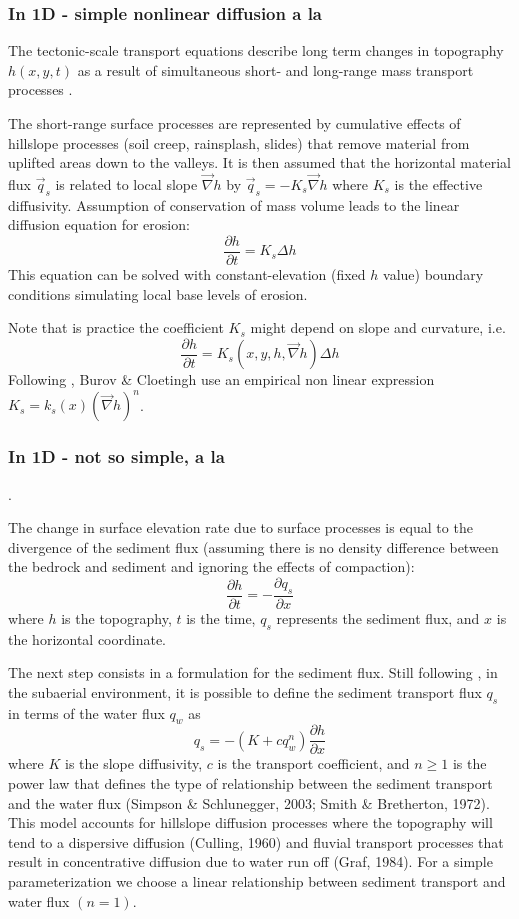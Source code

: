 \subsubsection{In 1D - simple nonlinear diffusion a la \cite{bucl97}}

The tectonic-scale transport equations describe long term changes
in topography $h(x,y,t)$ as a result of simultaneous short- and long-range
mass transport processes \cite{befh92,kobe94}.

The short-range surface processes are represented by cumulative effects of hillslope 
processes (soil creep, rainsplash, slides) that remove material from uplifted areas 
down to the valleys. 
It is then assumed that the horizontal material flux $\vec{q}_s$ is related to 
local slope $\vec\nabla h$ by $\vec{q}_s=-K_s \vec{\nabla}h$ 
where $K_s$ is the effective diffusivity. Assumption of conservation of mass 
volume leads to the linear diffusion equation for erosion:
\[
\frac{\partial h}{\partial t} = K_s \Delta h
\]
This equation can be solved with constant-elevation (fixed $h$ value)
boundary conditions simulating local base levels of erosion. 

Note that is practice the coefficient $K_s$ might depend on slope and curvature, 
i.e.
\[
\frac{\partial h}{\partial t} = K_s(x,y,h,\vec\nabla h)\Delta h
\]
Following \cite{goss76}, Burov \& Cloetingh use an empirical non linear 
expression $K_s=k_s(x) (\vec\nabla h)^n$. 




\subsubsection{In 1D - not so simple, a la \cite{anpa19}}. 

The change in surface elevation rate due to surface processes is equal
to the divergence of the sediment flux 
(assuming there is no density difference between the bedrock and
sediment and ignoring the effects of compaction):
\[
\frac{\partial h}{\partial t} = -\frac{\partial q_s}{\partial x}
\]
where $h$ is the topography, $t$ is the time, $q_s$ represents the sediment flux, 
and $x$ is the horizontal coordinate. 

The next step consists in a formulation for the sediment flux. Still following \cite{anpa19}, 
in the subaerial environment, it is possible to define the sediment transport 
flux $q_s$ in terms of the water flux $q_w$ as
\[
q_s=-(K+c q_w^n) \frac{\partial h}{\partial x}
\]
where $K$ is the slope diffusivity, $c$ is the transport coefficient, 
and $n \geq 1$ is the power law that defines the type
of relationship between the sediment transport and the water flux 
(Simpson \& Schlunegger, 2003; Smith \& Bretherton, 1972).
This model accounts for hillslope diffusion processes where the topography will tend to
a dispersive diffusion (Culling, 1960) and fluvial transport processes that result in concentrative diffusion
due to water run off (Graf, 1984). For a simple parameterization we choose a linear relationship between
sediment transport and water flux $(n=1)$.

